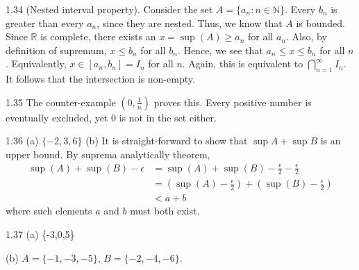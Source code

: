 1.34 (Nested interval property). Consider the set $A=\{a_n: n \in \mathbb{N} \}$. Every $b_n$ is greater than every $a_n$, since they are nested. Thus, we know that $A$ is bounded. Since $\mathbb{R}$ is complete, there exists an $x=\sup(A) \geq a_n$ for all $a_n$. Also, by definition of supremum, $x \leq b_n$ for all $b_n$. Hence, we see that $a_n \leq x \leq b_n$ for all $n$. Equivalently, $x \in [a_n, b_n]=I_n$ for all $n$. Again, this is equivalent to $\bigcap_{n=1}^{\infty}I_n$. It follows that the intersection is non-empty. 

1.35 The counter-example $(0,\frac{1}{n})$ proves this. Every positive number is eventually excluded, yet 0 is not in the set either.

1.36 (a) $\{-2,3,6\}$ 
(b) It is straight-forward to show that $\sup A + \sup B$ is an upper bound. By suprema analytically theorem,
\begin{align}
    \sup(A) + \sup(B) - \epsilon
    &= \sup(A) + \sup(B) - \frac{\epsilon}{2} - \frac{\epsilon}{2} \\
    &= (\sup(A) - \frac{\epsilon}{2})  + (\sup(B) - \frac{\epsilon}{2}) \\
    &< a + b    
\end{align}
where such elements $a$ and $b$ must both exist.

1.37 (a) \{-3,0,5\}

(b) $A=\{-1,-3,-5\}$, $B=\{-2,-4,-6\}$.